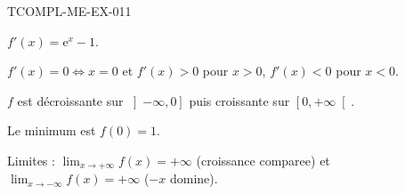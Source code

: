 \begin{corrige}{TCOMPL-ME-EX-011}

$f'(x) = \mathrm{e}^x - 1$.


$f'(x) = 0 \iff x = 0$ et $f'(x) > 0$ pour $x > 0$, $f'(x) < 0$ pour $x < 0$.

$f$ est décroissante sur $\left]-\infty, 0\right]$ puis croissante sur $\left[0, +\infty\right[$.

Le minimum est $f(0) = 1$.

Limites : $\lim_{x \to +\infty} f(x) = +\infty$ (croissance comparee) et $\lim_{x \to -\infty} f(x) = +\infty$ ($-x$ domine).

\end{corrige}
